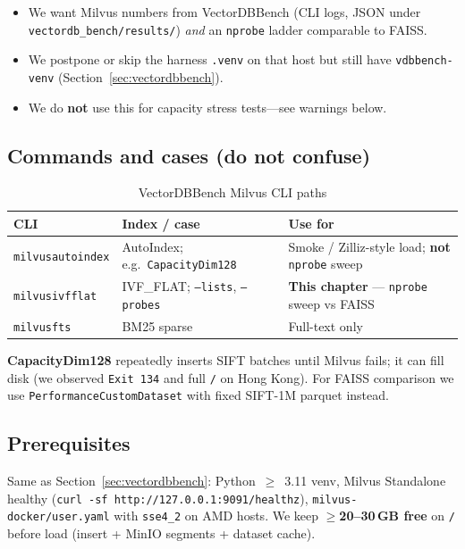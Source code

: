 \documentclass[11pt,a4paper]{article}
\begin{document}
\begin{itemize}[leftmargin=*]
  \item We want Milvus numbers from VectorDBBench (CLI logs, JSON under
        \texttt{vectordb\_bench/results/}) \emph{and} an \texttt{nprobe} ladder comparable
        to FAISS.
  \item We postpone or skip the harness \texttt{.venv} on that host but still have
        \texttt{vdbbench-venv} (Section~\ref{sec:vectordbbench}).
  \item We do \textbf{not} use this for capacity stress tests---see warnings below.
\end{itemize}

\subsection{Commands and cases (do not confuse)}

\begin{table}[h]
\centering
\caption{VectorDBBench Milvus CLI paths}
\begin{tabular}{@{}p{}p{}p{}@{}}
\toprule
\textbf{CLI} & \textbf{Index / case} & \textbf{Use for} \\
\midrule
\texttt{milvusautoindex} & AutoIndex; e.g.\ \texttt{CapacityDim128} & Smoke / Zilliz-style load; \textbf{not} \texttt{nprobe} sweep \\
\texttt{milvusivfflat} & IVF\_FLAT; \texttt{--lists}, \texttt{--probes} & \textbf{This chapter} --- \texttt{nprobe} sweep vs FAISS \\
\texttt{milvusfts} & BM25 sparse & Full-text only \\
\bottomrule
\end{tabular}
\end{table}

\textbf{CapacityDim128} repeatedly inserts SIFT batches until Milvus fails; it can fill disk
(we observed \texttt{Exit~134} and full \texttt{/} on Hong Kong). For FAISS comparison we use
\texttt{PerformanceCustomDataset} with fixed SIFT-1M parquet instead.

\subsection{Prerequisites}

Same as Section~\ref{sec:vectordbbench}: Python~$\geq$~3.11 venv, Milvus Standalone healthy
(\texttt{curl -sf http://127.0.0.1:9091/healthz}), \texttt{milvus-docker/user.yaml} with
\texttt{sse4\_2} on AMD hosts. We keep \textbf{$\geq$20--30\,GB free} on \texttt{/} before
load (insert + MinIO segments + dataset cache).
\end{document}

